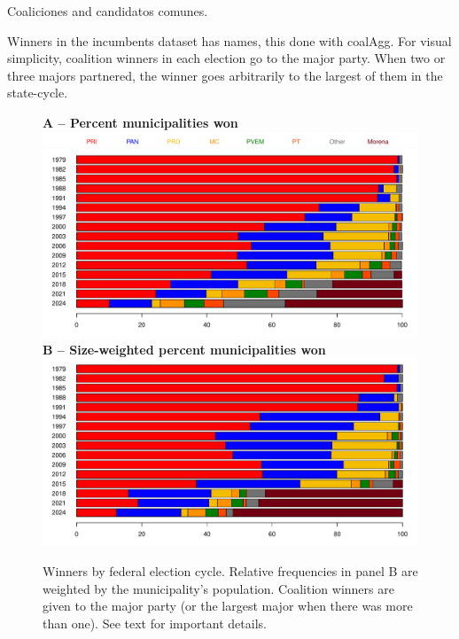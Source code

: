 \documentclass[letter,12pt]{article}
\begin{document}
Coaliciones and candidatos comunes.

Winners in the incumbents dataset has names, this done with coalAgg. For visual simplicity, coalition winners in each election go to the major party. When two or three majors partnered, the winner goes arbitrarily to the largest of them in the state-cycle. 

\begin{figure}
  \centering
  \textbf{A -- Percent municipalities won} \\
  \includegraphics[width=.9\columnwidth]{../../plots/pctwin1979-2024-legend.pdf} \\
  \includegraphics[width=.9\columnwidth]{../../plots/pctwin1979-2024.pdf} \\
  \textbf{B -- Size-weighted percent municipalities won} \\
  \includegraphics[width=.9\columnwidth]{../../plots/pctwin-popw1979-2024.pdf}
  \caption{Winners by federal election cycle. Relative frequencies in panel B are weighted by the municipality's population. Coalition winners are given to the major party (or the largest major when there was more than one). See text for important details.}\label{F:win}
\end{figure}  
\end{document}
